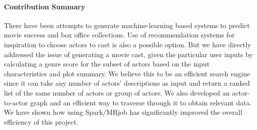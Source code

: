 \paragraph{Contribution Summary}
There have been attempts to generate machine-learning based systems to predict movie success and box office collections. Use of recommendation systems for inspiration to choose actors to cast is also a possible option. But we have directly addressed the issue of generating a movie cast, given the particular user inputs by calculating a genre score for the subset of actors based on the input characteristics and plot summary. We believe this to be an efficient search engine since it can take any number of actors’ descriptions as input and return a ranked list of the same number of actors or group of actors. We also developed an actor-to-actor graph and an efficient way to traverse through it to obtain relevant data. We have shown how using Spark/MRjob has significantly improved the overall efficiency of this project. 